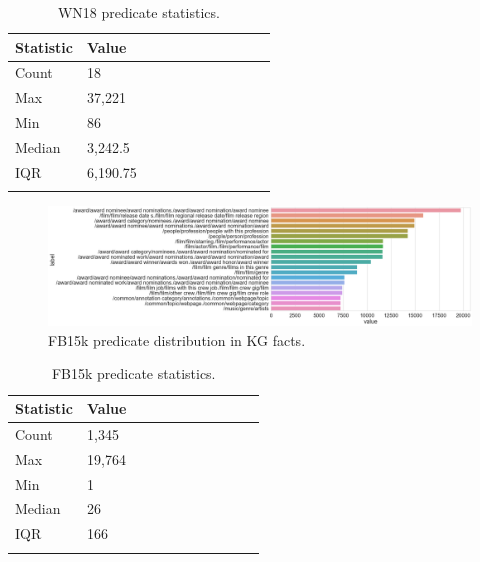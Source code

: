 \begin{table}[H]
		\centering
		\begin{tabular}{lllllllllll}
  			\textbf{Statistic} & \textbf{Value}  \\
  			\hline
			Count & 18 \\
			Max & 37,221  \\
			Min & 86 \\
  			Median & 3,242.5  \\
  			IQR & 6,190.75  \\
			&
		\end{tabular}
		\caption{WN18 predicate statistics.}
\end{table}

\begin{figure}[H]
   	\centering
    	\includegraphics[width=1.0\textwidth, height=0.3\textheight]{FB15k_Predicate_Counts}
	\captionsetup{justification=centering}
	\caption{FB15k predicate distribution in KG facts.}
\end{figure}

\begin{table}[H]
		\centering
		\begin{tabular}{lllllllllll}
  			\textbf{Statistic} & \textbf{Value}  \\
  			\hline
			Count & 1,345 \\
			Max & 19,764  \\
			Min & 1  \\
  			Median & 26  \\
  			IQR & 166  \\
			&
		\end{tabular}
		\caption{FB15k predicate statistics.}
\end{table}


